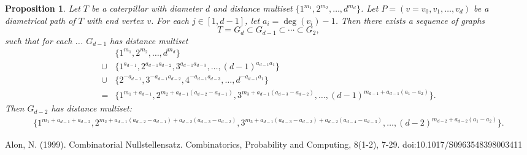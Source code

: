 \documentclass[12]{article}
\newtheorem{prop}[thm]{Proposition}
\theoremstyle{definition}
\begin{document}
	\begin{prop}
		Let $T$ be a caterpillar with diameter $d$ and distance multiset $\{1^{m_1}, 2^{m_2}, \ldots, d^{m_d}\}$.  Let $P = (v=v_0, v_1, \ldots, v_{d})$ be a diametrical path of $T$ with end vertex $v$.  For each $j \in [1,d-1]$, let $a_i= \deg(v_i)-1$.  Then there exists a sequence of graphs
		$$T = G_d \subset G_{d-1} \subset \cdots \subset G_2,$$
		such that for each ...
		$G_{d-1}$ has distance multiset
		\begin{align*}
			&\{1^{m_1}, 2^{m_2}, \ldots, d^{m_{d}}\}	\\
			\cup &\{1^{a_{d-1}}, 2^{a_{d-1}a_{d-2}}, 3^{a_{d-1}a_{d-3}}, \ldots, (d-1)^{a_{d-1}a_1}\}	\\
			\cup &\{2^{-a_{d-1}}, 3^{-a_{d-1}a_{d-2}}, 4^{-a_{d-1}a_{d-3}}, \ldots, d^{-a_{d-1}a_1}\}	\\
			= &\{1^{m_1 + a_{d-1}}, 2^{m_2 + a_{d-1}(a_{d-2}-a_{d-1})}, 3^{m_3 + a_{d-1}(a_{d-3}-a_{d-2})}, \ldots, (d-1)^{m_{d-1} + a_{d-1}(a_1 - a_2)}\}.
		\end{align*}
		Then $G_{d-2}$ has distance multiset:
		\begin{align*}
			\{1^{m_1 + a_{d-1}+ a_{d-2}}, 2^{m_2 + a_{d-1}(a_{d-2}-a_{d-1}) + a_{d-2}(a_{d-3} - a_{d-2})}, 3^{m_3 + a_{d-1}(a_{d-3}-a_{d-2}) + a_{d-2}(a_{d-4} - a_{d-3})}, \ldots, (d-2)^{m_{d-2} + a_{d-2}(a_1 - a_2)}\}.
		\end{align*}
	\end{prop}
	
	\newpage
	\begin{thebibliography}{100}
		 Alon, N. (1999). Combinatorial Nullstellensatz. Combinatorics, Probability and Computing, 8(1-2), 7-29. doi:10.1017/S0963548398003411
	\end{thebibliography}
	
\end{document}
